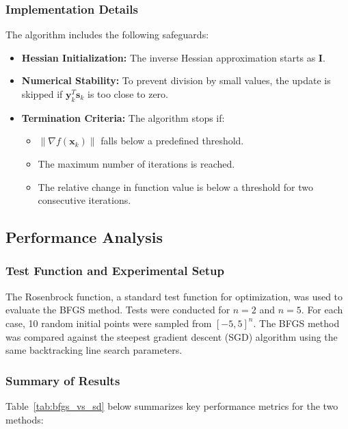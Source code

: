 \documentclass[12pt]{article}
\begin{document}
\subsubsection{Implementation Details}

The algorithm includes the following safeguards:

\begin{itemize}
    \item \textbf{Hessian Initialization:} The inverse Hessian approximation starts as \( \mathbf{I} \).
    \item \textbf{Numerical Stability:} To prevent division by small values, the update is skipped if \( \mathbf{y}_k^T \mathbf{s}_k \) is too close to zero.
    \item \textbf{Termination Criteria:} The algorithm stops if:
    \begin{itemize}
        \item \( \|\nabla f(\mathbf{x}_k)\| \) falls below a predefined threshold.
        \item The maximum number of iterations is reached.
        \item The relative change in function value is below a threshold for two consecutive iterations.
    \end{itemize}
\end{itemize}

\subsection{Performance Analysis}

\subsubsection{Test Function and Experimental Setup}

The Rosenbrock function, a standard test function for optimization, was used to evaluate the BFGS method. Tests were conducted for \( n = 2 \) and \( n = 5 \). For each case, 10 random initial points were sampled from \( [-5,5]^n \). The BFGS method was compared against the steepest gradient descent (SGD) algorithm using the same backtracking line search parameters.

\subsubsection{Summary of Results}

Table~\ref{tab:bfgs_vs_sd} below summarizes key performance metrics for the two methods:
\end{document}
